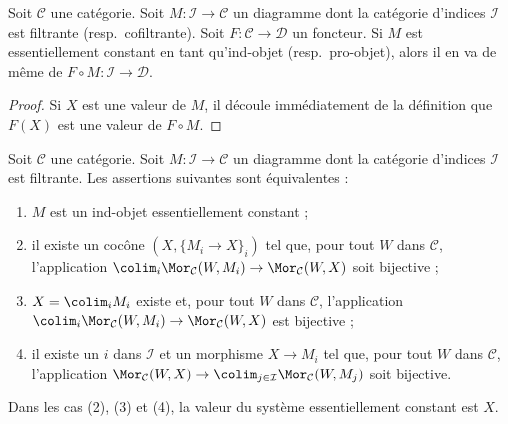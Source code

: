 \begin{lemma}
\label{lemma-image-essentially-constant}
Soit $\mathcal{C}$ une catégorie. Soit $M : \mathcal{I} \to \mathcal{C}$
un diagramme dont la catégorie d'indices $\mathcal{I}$ est filtrante
(resp.\ cofiltrante). Soit $F : \mathcal{C} \to \mathcal{D}$ un foncteur.
Si $M$ est essentiellement constant en tant qu'ind-objet (resp.\ pro-objet),
alors il en va de même de $F \circ M : \mathcal{I} \to \mathcal{D}$.
\end{lemma}

\begin{proof}
Si $X$ est une valeur de $M$, il découle immédiatement de la définition que
$F(X)$ est une valeur de $F \circ M$.
\end{proof}

\begin{lemma}
\label{lemma-characterize-essentially-constant-ind}
Soit $\mathcal{C}$ une catégorie. Soit $M : \mathcal{I} \to \mathcal{C}$
un diagramme dont la catégorie d'indices $\mathcal{I}$ est filtrante.
Les assertions suivantes sont équivalentes :
\begin{enumerate}
\item $M$ est un ind-objet essentiellement constant ;
\item il existe un cocône $(X, \{M_i \to X\}_i)$ tel que, pour tout $W$ dans
$\mathcal{C}$, l'application
$\colim_i \Mor_\mathcal{C}(W, M_i) \to \Mor_\mathcal{C}(W, X)$
soit bijective ;
\item $X = \colim_i M_i$ existe et, pour tout $W$ dans $\mathcal{C}$,
l'application
$\colim_i \Mor_\mathcal{C}(W, M_i) \to \Mor_\mathcal{C}(W, X)$
est bijective ;
\item il existe un $i$ dans $\mathcal{I}$ et un morphisme $X \to M_i$ tel que, pour tout $W$ dans $\mathcal{C}$, l'application
$\Mor_\mathcal{C}(W, X) \to
\colim_{j \in \mathcal{I}} \Mor_\mathcal{C}(W, M_j)$
soit bijective.
\end{enumerate}
Dans les cas (2), (3) et (4), la valeur du système essentiellement constant
est $X$.
\end{lemma}

